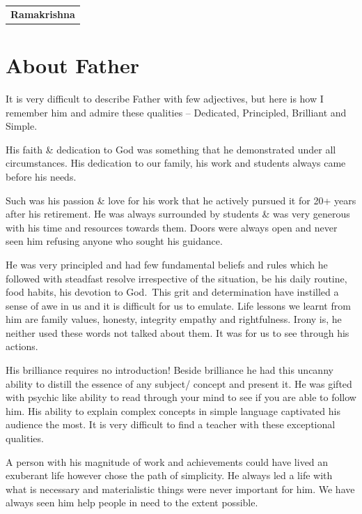 \bigskip

\begin{flushright}
\begin{tabular}{c}
\multicolumn{1}{p{2cm}}{\textbf{Ramakrishna}}
\end{tabular}
\end{flushright}

\newpage

\section*{About Father}

It is very difficult to describe Father with few adjectives, but here is how I remember him and admire these qualities – Dedicated, Principled, Brilliant and Simple.

His faith \& dedication to God was something that he demonstrated under all circumstances. His dedication to our family, his work and students always came before his needs.

Such was his passion \& love for his work that he actively pursued it for 20+ years after his retirement. He was always surrounded by students \& was very generous with his time and resources towards them. Doors were always open and never seen him refusing anyone who sought his guidance.

He was very principled and had few fundamental beliefs and rules which he followed with steadfast resolve irrespective of the situation, be his daily routine, food habits, his devotion to God. This grit and determination have instilled a sense of awe in us and it is difficult for us to emulate. Life lessons we learnt from him are family values, honesty, integrity empathy and rightfulness. Irony is, he neither used these words not talked about them. It was for us to see through his actions.  

His brilliance requires no introduction! Beside brilliance he had this uncanny ability to distill the essence of any subject/ concept and present it. He was gifted with psychic like ability to read through your mind to see if you are able to follow him. His ability to explain complex concepts in simple language captivated his audience the most. It is very difficult to find a teacher with these exceptional qualities. 

A person with his magnitude of work and achievements could have lived an exuberant life however chose the path of simplicity. He always led a life with what is necessary and materialistic things were never important for him. We have always seen him help people in need to the extent possible. 

